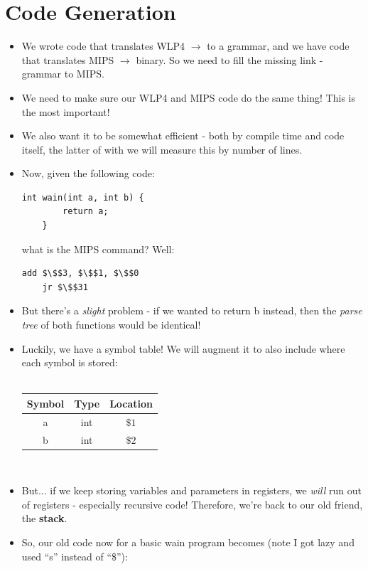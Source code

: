 \documentclass[12pt]{article}
\begin{document}
\section{Code Generation}
\begin{itemize}
    \item We wrote code that translates WLP4 $\rightarrow$ to a grammar, and we have code that translates MIPS $\rightarrow$ binary.  So we need to fill the missing link - grammar to MIPS.
    \item We need to make sure our WLP4 and MIPS code do the same thing!  This is the most important!
    \item We also want it to be somewhat efficient - both by compile time and code itself, the latter of with we will measure this by number of lines.
    \item Now, given the following code:
    \begin{lstlisting}[mathescape, numbers=none, breaklines=true]
    int wain(int a, int b) {
        return a;
    }
    \end{lstlisting}
    what is the MIPS command?  Well:
    \begin{lstlisting}[mathescape, numbers=none, breaklines=true]
    add $\$$3, $\$$1, $\$$0
    jr $\$$31
    \end{lstlisting}
    \item But there's a \emph{slight} problem - if we wanted to return b instead, then the \emph{parse tree} of both functions would be identical!
    \item Luckily, we have a symbol table!  We will augment it to also include where each symbol is stored:\\\\
        \begin{tabular}{|c|c|c|}
            \hline
            Symbol & Type & Location \\
            \hline
            a & int & $\$1$ \\
            b & int & $\$2$ \\
            \hline
        \end{tabular}\\
    \item But... if we keep storing variables and parameters in registers, we \emph{will} run out of registers - especially recursive code!  Therefore, we're back to our old friend, the \textbf{stack}.
    \item So, our old code now for a basic wain program becomes (note I got lazy and used ``s'' instead of ``\$''):

\end{itemize}
\end{document}

